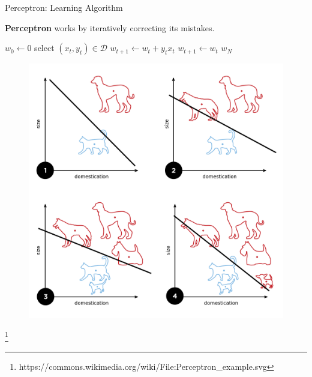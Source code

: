 \documentclass[notheorems]{beamer}
\newcommand{\source}[1]{{\let\thefootnote\relax\footnote{{\tiny #1}}}}
\begin{document}
    \begin{frame}{Perceptron: Learning Algorithm}
        \vspace{-0.5cm}
        \begin{center}
            \textbf{Perceptron} works by iteratively correcting its mistakes.
        \end{center}
        \vspace{-0.25cm}
        \begin{minipage}[t]{0.55\textwidth}
            \begin{algorithm}[H]
                \centering
                \caption{Perceptron Algorithm}
                \begin{algorithmic}[1]
                    \State $w_0 \gets 0$
                    \State select $(x_t, y_t) \in \mathcal{D}$
                            \State $w_{t+1} \gets w_{t} + y_t x_t$
                        \Else
                            \State $w_{t+1} \gets w_{t}$
                        \EndIf
                    \EndFor
                \State \Return $w_{N}$
                \end{algorithmic}
                \label{alg:slang}
            \end{algorithm}
        \end{minipage}%
        \hfill%
        \begin{minipage}[t]{0.4\textwidth}
            \vspace{0.75cm}
            \begin{figure}
                \centering
                \includegraphics[width=1.2\textwidth]{figures/Perceptron_example}
            \end{figure}
        \end{minipage}

        \source{https://commons.wikimedia.org/wiki/File:Perceptron\_example.svg}
    \end{frame}
\end{document}
